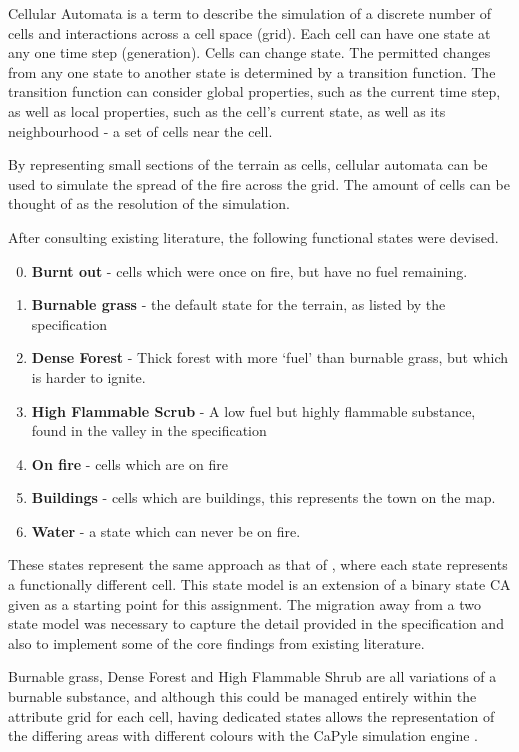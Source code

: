 \documentclass[11pt, a4paper, titlepage]{article}
\begin{document}
Cellular Automata is a term to describe the simulation of a discrete number of cells and interactions across a cell space (grid). Each cell can have one state at any one time step (generation). Cells can change state. The permitted changes from any one state to another state is determined by a transition function. The transition function can consider global properties, such as the current time step, as well as local properties, such as the cell's current state, as well as its neighbourhood - a set of cells near the cell. 

By representing small sections of the terrain as cells, cellular automata can be used to simulate the spread of the fire across the grid. The amount of cells can be thought of as the resolution of the simulation. 

After consulting existing literature, the following functional states were devised. 

\begin{enumerate}
  \setcounter{enumi}{-1}
  \item \textbf{Burnt out} - cells which were once on fire, but have no fuel remaining.
  \item \textbf{Burnable grass} - the default state for the terrain, as listed by the specification
  \item \textbf{Dense Forest} - Thick forest with more `fuel' than burnable grass, but which is harder to ignite.
  \item \textbf{High Flammable Scrub} - A low fuel but highly flammable substance, found in the valley in the specification
  \item \textbf{On fire} - cells which are on fire
  \item \textbf{Buildings} - cells which are buildings, this represents the town on the map.
  \item \textbf{Water} - a state which can never be on fire.
\end{enumerate}

These states represent the same approach as that of \cite{ALEXANDRIDIS2008191}, where each state represents a functionally different cell. This state model is an extension of a binary state CA given as a starting point for this assignment. The migration away from a two state model was necessary to capture the detail provided in the specification and also to implement some of the core findings from existing literature.

Burnable grass, Dense Forest and High Flammable Shrub are all variations of a burnable substance, and although this could be managed entirely within the attribute grid for each cell, having dedicated states allows the representation of the differing areas with different colours with the CaPyle simulation engine \cite{capyle_home_2016}. 
\end{document}

